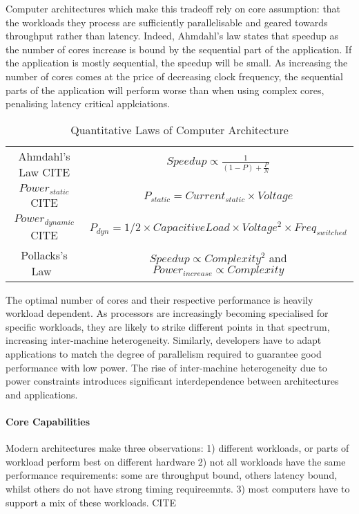 Computer architectures which make this tradeoff rely on core assumption: that the workloads they process
are sufficiently parallelisable and geared towards throughput rather than latency.
Indeed, Ahmdahl's law states that speedup as the number of cores increase
is bound by the sequential part of the application. If the application 
is mostly sequential, the speedup will be small. As increasing the number of 
cores comes at the price of decreasing clock frequency, the sequential
parts of the application will perform worse than when using complex cores, penalising latency
critical applciations. 

\begin{table*}
\begin{center}
\label{table:quantlaws}
\caption{Quantitative Laws of Computer Architecture}
\begin{tabular}{|c|c|}
Ahmdahl's Law CITE & $ Speedup \propto \frac{1}{(1 - P) + \frac{P}{N}} $\\ 
$Power_{static}$ CITE & $P_{static} = Current_{static} \times Voltage$ \\
$Power_{dynamic}$ CITE & $P_{dyn} = 1/2 \times Capacitive Load  \times Voltage^{2} \times Freq_{switched}$\\
Pollacks's Law~\cite{borkar2011future}& $ Speedup \propto Complexity^{2}$ and  $Power_{increase} \propto Complexity$\\
\end{tabular}
\end{center}

\end{table*}

The optimal number of cores and their respective 
performance is heavily workload dependent. As processors 
are increasingly becoming specialised for specific workloads,
they are likely to strike different points in that spectrum, 
increasing inter-machine heterogeneity. Similarly,
developers have to adapt applications to match 
the degree of parallelism required to guarantee good performance
with low power. The rise of inter-machine heterogeneity
due to power constraints introduces significant interdependence
between architectures and applications. 

\paragraph{Core Capabilities}
Modern architectures make three observations: 1) different workloads,
or parts of workload perform best on different hardware 2) not all
workloads have the same performance requirements: some are throughput
bound, others latency bound, whilst others do not have strong timing requireemnts.
3) most computers have to support a mix of these workloads.  CITE

